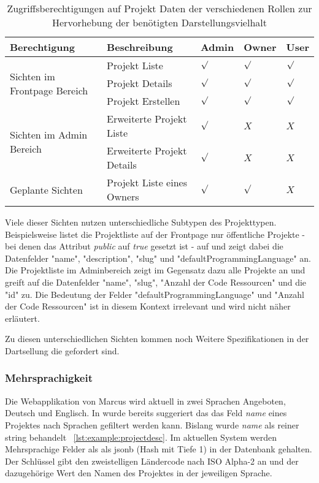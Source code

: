 \begin{table}[h!]
    \begin{tabular}{|p{}|p{}|p{}|p{}|p{}|}
        \hline
        \textbf{Berechtigung} & \textbf{Beschreibung} & \textbf{Admin} & \textbf{Owner} & \textbf{User} \\ \hline
        \multirow{3}{*}{Sichten im Frontpage Bereich}
        & Projekt Liste & $\surd$ & $\surd$ & $\surd$\\
        & Projekt Details & $\surd$ & $\surd$ & $\surd$\\
        & Projekt Erstellen & $\surd$ & $\surd$ & $\surd$ \\
        \hline
        \multirow{2}{*}{Sichten im Admin Bereich}
        & Erweiterte Projekt Liste & $\surd$ & $X$ & $X$\\
        & Erweiterte Projekt Details & $\surd$ & $X$ & $X$\\
        \hline
        \multirow{1}{*}{Geplante Sichten}
        & Projekt Liste eines Owners & $\surd$ & $\surd$ & $X$\\
        \hline
    \end{tabular}
    \vspace{5pt}
    \caption{Zugriffsberechtigungen auf Projekt Daten der verschiedenen Rollen zur Hervorhebung der benötigten Darstellungsvielhalt}
    \label{tbl:req:roles}
\end{table}

Viele dieser Sichten nutzen unterschiedliche Subtypen des Projekttypen.
Beispielsweise listet die Projektliste auf der Frontpage nur öffentliche Projekte - bei denen das Attribut \emph{public} auf \emph{true} gesetzt ist -
auf und zeigt dabei die Datenfelder "name", "description", "slug" und "defaultProgrammingLanguage" an.
Die Projektliste im Adminbereich zeigt im Gegensatz dazu alle Projekte an und greift auf
die Datenfelder "name", "slug", "Anzahl der Code Ressourcen" und die "id" zu.
Die Bedeutung der Felder "defaultProgrammingLanguage" und "Anzahl der Code Ressourcen" ist in diesem Kontext irrelevant und wird nicht näher erläutert.

Zu diesen unterschiedlichen Sichten kommen noch Weitere Spezifikationen in der Dartsellung die gefordert sind.

\subsubsection{Mehrsprachigkeit}
Die Webapplikation von Marcus wird aktuell in zwei Sprachen Angeboten, Deutsch und Englisch.
In  wurde bereits suggeriert das das Feld \emph{name} eines Projektes nach Sprachen gefiltert werden kann.
Bislang wurde \emph{name} als reiner string behandelt ~\ref{lst:example:projectdesc}. Im aktuellen System werden Mehrsprachige Felder als
als jsonb (Hash mit Tiefe 1) in der Datenbank gehalten. Der Schlüssel gibt den zweistelligen Ländercode nach ISO Alpha-2 \cite{iso-alpha-2} an
und der dazugehörige Wert den Namen des Projektes in der jeweiligen Sprache.

